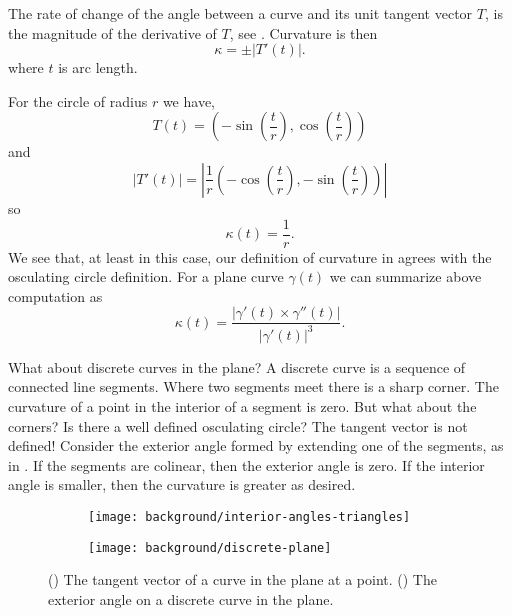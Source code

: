 The rate of change of the angle between a curve and its unit tangent vector $T$, is the magnitude
of the derivative of $T$, see . Curvature is then
\begin{equation} \label{eqn:kappa}
\kappa= \pm | T'(t)|.
\end{equation}
where $t$ is arc length.  


For the circle of radius $r$ we have,
$$T(t)=\left(-\sin\left(\frac{t}{r}\right),\cos\left(\frac{t}{r}\right)\right)$$
and 
$$|T'(t)|=\left|\frac{1}{r}\left(-\cos\left(\frac{t}{r}\right),-\sin\left(\frac{t}{r}\right)\right)\right|$$
so
$$\kappa(t)=\frac{1}{r}.$$
We see that,  at least in this case, our definition of curvature in  agrees with the
osculating circle definition. 
For a plane curve $\gamma(t)$ we can summarize above computation as
\begin{equation} \label{eqn:kappa1}
\kappa(t)=\frac{|\gamma'(t)\times \gamma''(t)|}{|\gamma'(t)|^3}.
\end{equation}

What about discrete curves in the plane? A discrete curve is a sequence of connected
line segments. Where two
segments meet there is a sharp corner. The curvature of a point in the interior of a segment
is zero. But what about the corners? Is there a well defined osculating circle? The tangent
vector is not defined!
Consider the exterior angle formed by extending one of the segments, as in . 
If the segments are colinear, then the exterior angle is zero. If the interior angle
is smaller, then the curvature is greater as desired.




\begin{figure}[htb]
    \captionsetup[subfigure]{justification=centering}
    \centering
    \begin{subfigure}[b]{0.35\textwidth}
        \texttt{[image: background/interior-angles-triangles]}
       \subcaption{}\label{fig:smooth-tangent}
    \end{subfigure}
        \hspace{1cm}
        \begin{subfigure}[b]{0.35\textwidth}
        \texttt{[image: background/discrete-plane]}
        \subcaption{}\label{fig:discrete-plane}
        \end{subfigure}
    \caption{() The tangent vector of a curve in the plane at a point.
        () The exterior angle on a discrete curve in the plane.
    }
    \label{fig:osculating-sphere}
\end{figure}







